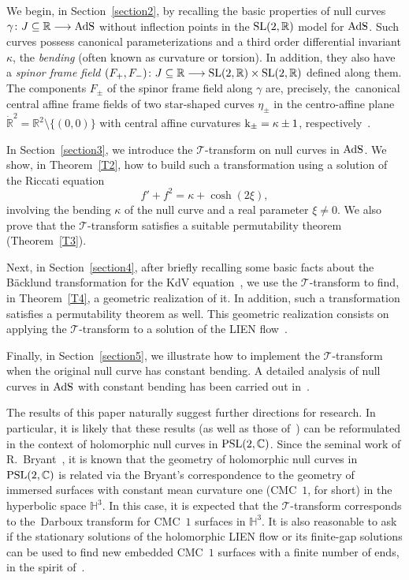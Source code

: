 \documentclass[10pt,a4paper]{amsart}
\numberwithin{equation}{section}
\def\bending{\kappa}
\def\R{\mathbb{R}}
\def\curvature{{\rm k}}
\def\SL{{\rm SL}(2,\R)}
\def\PSL{{\rm PSL}(2,\mathbb{C})}
\def\AdS{{\rm AdS}}
\begin{document}
We begin, in Section~\ref{section2}, by recalling the basic properties of null curves $\gamma\colon J\subseteq\R\longrightarrow\AdS$ without inflection points in the $\SL$ model for $\AdS$. Such curves possess canonical parameterizations and a third order differential invariant $\bending$, the \emph{bending} (often known as curvature or torsion). In addition, they also have a \emph{spinor frame field} $(F_+,F_-)\colon J\subseteq\R\longrightarrow\SL\times\SL$ defined along them. The components $F_\pm$ of the spinor frame field along $\gamma$ are, precisely, the~canonical central affine frame fields of two star-shaped curves $\eta_\pm$ in the centro-affine plane $\dot{\R}^2=\R^2\setminus\{(0,0)\}$ with central affine curvatures $\curvature_\pm=\bending\pm 1$, respectively~\cite{MP}.

In Section~\ref{section3}, we introduce the $\mathcal{T}$-transform on null curves in $\AdS$. We show, in Theorem~\ref{T2}, how to build such a transformation using a solution of the Riccati equation
\begin{equation*}
	f'+f^2=\bending+\cosh(2\xi),
\end{equation*}
involving the bending $\bending$ of the null curve and a real parameter $\xi\neq 0$. We also prove that the $\mathcal{T}$-transform satisfies a suitable permutability theorem (Theorem~\ref{T3}).

Next, in Section~\ref{section4}, after briefly recalling some basic facts about the B\"{a}cklund transformation for the KdV equation~\cite{TU,TW2}, we use the $\mathcal{T}$-transform to find, in Theorem~\ref{T4}, a geometric realization of it. In addition, such a transformation satisfies a permutability theorem as well. This geometric realization consists on applying the $\mathcal{T}$-transform to a solution of the LIEN flow~\cite{MP}.

Finally, in Section~\ref{section5}, we illustrate how to implement the $\mathcal{T}$-transform when the original null curve has constant bending. A detailed analysis of null curves in $\AdS$ with constant bending has been carried out in~\cite{MP}.

The results of this paper naturally suggest further directions for research. In particular, it is likely that these results (as well as those of~\cite{MP}) can be reformulated in the context of holomorphic null curves in $\PSL$. Since the seminal work of R.~Bryant~\cite{Br1}, it is known that the geometry of holomorphic null curves \cite{Br2,MN3} in $\PSL$ is related via the Bryant's correspondence to the geometry of immersed surfaces with constant mean curvature one (CMC~$1$, for short) in the hyperbolic space $\mathbb{H}^3$. In this case, it is expected that the $\mathcal{T}$-transform corresponds to the~Darboux transform for CMC~$1$ surfaces in $\mathbb{H}^3$. It is also reasonable to ask if the stationary solutions of the holomorphic LIEN flow or its finite-gap solutions can be used to find new embedded CMC~$1$ surfaces with a finite number of ends, in the spirit of~\cite{BPS}.
\end{document}
